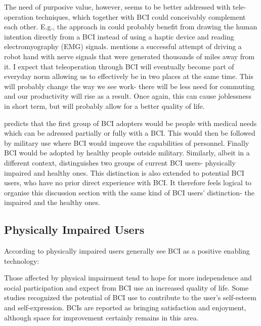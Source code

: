 \documentclass[fleqn,11pt]{olplainarticle}
\begin{document}
The need of purposive value, however, seems to be better addressed with tele-operation techniques, which together with BCI could conceivably complement each other. E.g., the approach in \cite{luo2019teleoperation} could probably benefit from drawing the human intention directly from a BCI instead of using a haptic device and reading electromyography (EMG) signals. \cite{warwick2003cyborg} mentions a successful attempt of driving a robot hand with nerve signals that were generated thousands of miles away from it. I expect that teleoperation through BCI will eventually become part of everyday norm allowing us to effectively be in two places at the same time. This will probably change the way we see work- there will be less need for commuting and our productivity will rise as a result. Once again, this can cause joblessness in short term, but will probably allow for a better quality of life.








\cite{schalk2008brain} predicts that the first group of BCI adopters would be people with medical needs which can be adressed partially or fully with a BCI. This would then be followed by military use where BCI would improve the capabilities of personnel. Finally BCI would be adopted by healthy people outside military. Similarly, albeit in a different context, \cite{kogel2019using} distinguishes two groups of current BCI users- physically impaired and healthy ones. This distinction is also extended to potential BCI users, who have no prior direct experience with BCI. It therefore feels logical to organise this discussion section with the same kind of BCI users' distinction- the impaired and the healthy ones.

\subsection{Physically Impaired Users}
According to \cite{kogel2019using} physically impaired users generally see BCI as a positive enabling technology:
\begin{displayquote}
    Those affected by physical impairment tend to hope for more independence and social participation and expect from BCI use an increased quality of life. Some studies recognized the potential of BCI use to contribute to the user’s self-esteem and self-expression. BCIs are reported as bringing satisfaction and enjoyment, although space for improvement certainly remains in this area.
\end{displayquote}
\end{document}
